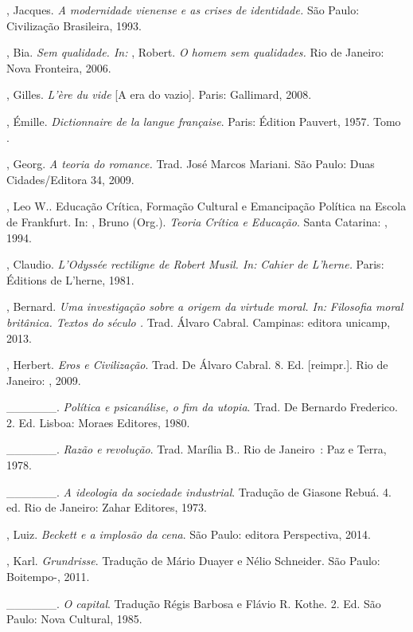 \begin{Parskip}
, Jacques. \emph{A modernidade vienense e as crises de
identidade.} São Paulo: Civilização Brasileira, 1993.

, Bia. \emph{Sem qualidade. In:} , Robert. \emph{O homem sem
qualidades.} Rio de Janeiro: Nova Fronteira, 2006.

, Gilles. \emph{L'ère du vide} [A era do vazio]. Paris:
Gallimard, 2008.

, Émille. \emph{Dictionnaire de la langue française}. Paris:
Édition Pauvert, 1957. Tomo .

, Georg. \emph{A teoria do romance.} Trad. José Marcos Mariani.
São Paulo: Duas Cidades/Editora 34, 2009.

, Leo W.. Educação Crítica, Formação Cultural e Emancipação Política
na Escola de Frankfurt. In: , Bruno (Org.). \emph{Teoria Crítica
e Educação}. Santa Catarina: , 1994.

, Claudio. \emph{L'Odyssée rectiligne de Robert Musil. In:}
\emph{Cahier de L'herne.} Paris: Éditions de L'herne, 1981.

, Bernard. \emph{Uma investigação sobre a origem da virtude
moral. In:} \emph{Filosofia moral britânica. Textos do século .}
Trad. Álvaro Cabral. Campinas: editora unicamp, 2013.

, Herbert. \emph{Eros e Civilização}. Trad. De Álvaro Cabral.
8. Ed. [reimpr.]. Rio de Janeiro: , 2009.

\_\_\_\_\_\_. \emph{Política e psicanálise, o fim da utopia}. Trad. De
Bernardo Frederico. 2. Ed. Lisboa: Moraes Editores, 1980.

\_\_\_\_\_\_. \emph{Razão e} \emph{revolução}. Trad. Marília B.. Rio
de Janeiro~: Paz e Terra, 1978.

\_\_\_\_\_\_. \emph{A ideologia da sociedade industrial}. Tradução de
Giasone Rebuá. 4. ed. Rio de Janeiro: Zahar Editores, 1973.

, Luiz. \emph{Beckett e a implosão da cena}. São Paulo: editora
Perspectiva, 2014.

, Karl. \emph{Grundrisse}. Tradução de Mário Duayer e Nélio
Schneider. São Paulo: Boitempo-, 2011.

\_\_\_\_\_\_. \emph{O capital}. Tradução Régis Barbosa e Flávio R.
Kothe. 2. Ed. São Paulo: Nova Cultural, 1985.


\end{Parskip}
